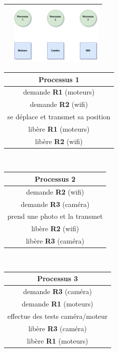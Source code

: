 \documentclass[12pt,a4paper,article,english,firamath]{nsi}
\newcommand{\truc}{4.5cm}
\begin{document}
\begin{center}
\begin{tabular}{|c|c|}
\hline
 & \includegraphics[width=\truc]{img/d6.png} \\
\hline
 \end{tabular}
\end{center}
\newpage




\begin{center}
\begin{tabular}{|c|}
\hline
\rowcolor{UGLiOrange} \textbf{\color{white}Processus 1 }\\
\hline
demande \textbf{R1} (moteurs) \\
\hline
demande \textbf{R2} (wifi) \\
\hline
se déplace et transmet sa position\\
\hline
libère \textbf{R1} (moteurs) \\
\hline
libère \textbf{R2} (wifi) \\
\hline
\end{tabular}
\end{center}
\ \\
\begin{center}
\begin{tabular}{|c|}
\hline
\rowcolor{UGLiOrange} \textbf{\color{white}Processus 2}\\
\hline
demande \textbf{R2} (wifi) \\
\hline
 demande \textbf{R3} (caméra) \\
\hline
prend une photo et la transmet\\
\hline
 libère \textbf{R2} (wifi)   \\
\hline
 libère \textbf{R3} (caméra)   \\
\hline
\end{tabular}
\end{center}
\ \\
\begin{center}
\begin{tabular}{|c|}
\hline
\rowcolor{UGLiOrange}\textbf{\color{white}Processus 3} \\
\hline
 demande \textbf{R3} (caméra) \\
\hline
demande \textbf{R1} (moteurs) \\
\hline
effectue des tests caméra/moteur\\
\hline
libère \textbf{R3} (caméra)  \\
\hline
libère \textbf{R1} (moteurs)  \\
\hline
\end{tabular}
\end{center}
\end{document}
